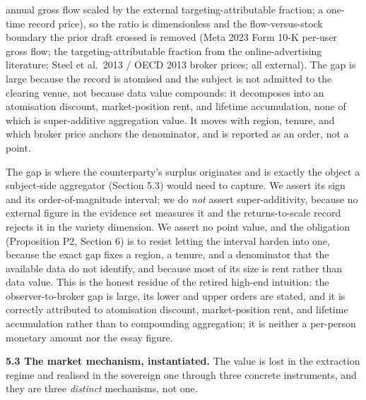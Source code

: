 \documentclass[
  11pt,
]{article}
\newcounter{none} %
\begin{document}
{\begin{longtable}[]
annual gross flow scaled by the external targeting-attributable
fraction; a one-time record price), so the ratio is dimensionless and
the flow-versus-stock boundary the prior draft crossed is removed (Meta
2023 Form 10-K per-user gross flow; the targeting-attributable fraction
from the online-advertising literature; Steel et al.~2013 / OECD 2013
broker prices; all external). The gap is large because the record is
atomised and the subject is not admitted to the clearing venue, not
because data value compounds: it decomposes into an atomisation
discount, market-position rent, and lifetime accumulation, none of which
is super-additive aggregation value. It moves with region, tenure, and
which broker price anchors the denominator, and is reported as an order,
not a point. \\
\end{longtable}
}

The gap is where the counterparty's surplus originates and is exactly
the object a subject-side aggregator (Section 5.3) would need to
capture. We assert its sign and its order-of-magnitude interval; we do
\emph{not} assert super-additivity, because no external figure in the
evidence set measures it and the returns-to-scale record rejects it in
the variety dimension. We assert no point value, and the obligation
(Proposition P2, Section 6) is to resist letting the interval harden
into one, because the exact gap fixes a region, a tenure, and a
denominator that the available data do not identify, and because most of
its size is rent rather than data value. This is the honest residue of
the retired high-end intuition: the observer-to-broker gap is large, its
lower and upper orders are stated, and it is correctly attributed to
atomisation discount, market-position rent, and lifetime accumulation
rather than to compounding aggregation; it is neither a per-person
monetary amount nor the essay figure.

\textbf{5.3 The market mechanism, instantiated.} The value is lost in
the extraction regime and realised in the sovereign one through three
concrete instruments, and they are three \emph{distinct} mechanisms, not
one.
\end{document}
